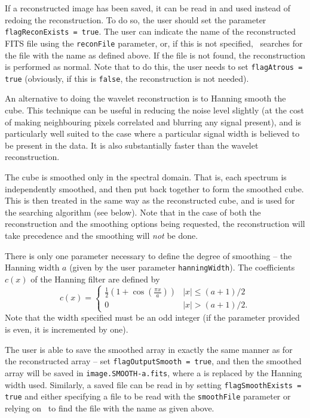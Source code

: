 If a reconstructed image has been saved, it can be read in and used
instead of redoing the reconstruction. To do so, the user should set
the parameter \texttt{flagReconExists = true}. The user can indicate
the name of the reconstructed FITS file using the \texttt{reconFile}
parameter, or, if this is not specified, \duchamp\ searches for the
file with the name as defined above. If the file is not found, the
reconstruction is performed as normal. Note that to do this, the user
needs to set
\texttt{flagAtrous = true} (obviously, if this is \texttt{false}, the
reconstruction is not needed).

\label{sec-smoothing}

An alternative to doing the wavelet reconstruction is to Hanning
smooth the cube. This technique can be useful in reducing the noise
level slightly (at the cost of making neighbouring pixels correlated
and blurring any signal present), and is particularly well suited to
the case where a particular signal width is believed to be present in
the data. It is also substantially faster than the wavelet
reconstruction.

The cube is smoothed only in the spectral domain. That is, each
spectrum is independently smoothed, and then put back together to form
the smoothed cube. This is then treated in the same way as the
reconstructed cube, and is used for the searching algorithm (see
below). Note that in the case of both the reconstruction and the
smoothing options being requested, the reconstruction will take
precedence and the smoothing will \emph{not} be done.

There is only one parameter necessary to define the degree of
smoothing -- the Hanning width $a$ (given by the user parameter
\texttt{hanningWidth}). The coefficients $c(x)$ of the Hanning filter
are defined by
\[
c(x) = 
  \begin{cases}
   \frac{1}{2}\left(1+\cos(\frac{\pi x}{a})\right) &|x| \leq (a+1)/2\\
   0                                               &|x| > (a+1)/2.
  \end{cases}
\]
Note that the width specified must be an odd integer (if the parameter
provided is even, it is incremented by one).

The user is able to save the smoothed array in exactly the same manner
as for the reconstructed array -- set \texttt{flagOutputSmooth =
true}, and then the smoothed array will be saved in
\texttt{image.SMOOTH-a.fits}, where a is replaced by the Hanning width
used. Similarly, a saved file can be read in by setting
\texttt{flagSmoothExists = true} and either specifying a file to be
read with the \texttt{smoothFile} parameter or relying on \duchamp\ to
find the file with the name as given above. 


